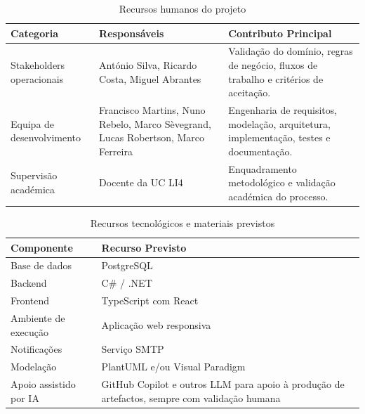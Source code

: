 \documentclass[a4paper,12pt]{scrreprt}
\begin{document}
        \begin{table}[H]
            \centering
            \small
            \begin{tabular}{|p{3.3cm}|p{4.5cm}|p{5.9cm}|}
                \hline
                \rowcolor{gray!20!white}
                \textbf{Categoria} & \textbf{Responsáveis} & \textbf{Contributo Principal} \\
                \hline
                Stakeholders operacionais & António Silva, Ricardo Costa, Miguel Abrantes & Validação do domínio, regras de negócio, fluxos de trabalho e critérios de aceitação. \\
                \hline
                Equipa de desenvolvimento & Francisco Martins, Nuno Rebelo, Marco Sèvegrand, Lucas Robertson, Marco Ferreira & Engenharia de requisitos, modelação, arquitetura, implementação, testes e documentação. \\
                \hline
                Supervisão académica & Docente da UC LI4 & Enquadramento metodológico e validação académica do processo. \\
                \hline
            \end{tabular}
            \caption{Recursos humanos do projeto}
        \end{table}

        \begin{table}[H]
            \centering
            \small
            \begin{tabular}{|p{4cm}|p{9.7cm}|}
                \hline
                \rowcolor{gray!20!white}
                \textbf{Componente} & \textbf{Recurso Previsto} \\
                \hline
                Base de dados & PostgreSQL \\
                \hline
                Backend & C\# / .NET \\
                \hline
                Frontend & TypeScript com React \\
                \hline
                Ambiente de execução & Aplicação web responsiva \\
                \hline
                Notificações & Serviço SMTP \\
                \hline
                Modelação & PlantUML e/ou Visual Paradigm \\
                \hline
                Apoio assistido por IA & GitHub Copilot e outros LLM para apoio à produção de artefactos, sempre com validação humana \\
                \hline
            \end{tabular}
            \caption{Recursos tecnológicos e materiais previstos}
        \end{table}
\end{document}
